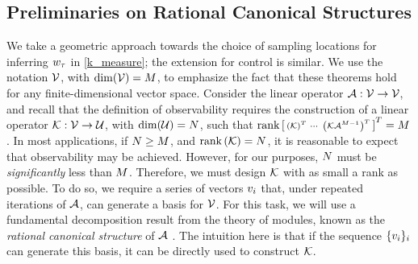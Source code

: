 \subsection{Preliminaries on Rational Canonical Structures}\label{sec_prelim}
We take a geometric approach towards the choice of sampling locations for inferring $w_{\tau}$ in  \eqref{k_measure}; the extension for control is similar.  We use the notation $\mathcal{V}$, with $\operatorname{dim}(\mathcal{V})=M$, to emphasize the fact that these theorems hold for any finite-dimensional vector space. Consider the linear operator $\mathcal{A}:\mathcal{V}\rightarrow\mathcal{V}$, and recall that the definition of observability requires the construction of a linear operator $\mathcal{K}:\mathcal{V}\to\mathcal{U}$, with $\dim(\mathcal{U}) = N$, such that 
$\operatorname{rank}\left[
 \begin{smallmatrix}
  \left(\mathcal{K}\right)^T &
  \cdots &
  \left(\mathcal{K} \mathcal{A}^{M-1}\right)^T
 \end{smallmatrix}
 \right]^T = M$. 
In most applications, if $N\geq M$, and $\operatorname{rank}\left(\mathcal{K}\right) = N$, it is reasonable to expect that observability may be achieved. However, for our purposes, $N$ must be \emph{significantly} less than $M$. Therefore, we must design $\mathcal{K}$ with as small a rank as possible. To do so, we require a series of vectors $v_i$ that, under repeated iterations of $\mathcal{A}$, can generate a basis for $\mathcal{V}$. For this task, we will use a fundamental decomposition result from the theory of modules, known as the \emph{rational canonical structure} of $\mathcal{A}$ \cite{wonham1974linear}. The intuition here is that if the sequence $\{v_i\}_{i}$ can generate this basis, it can be directly used to construct $\mathcal{K}$.

